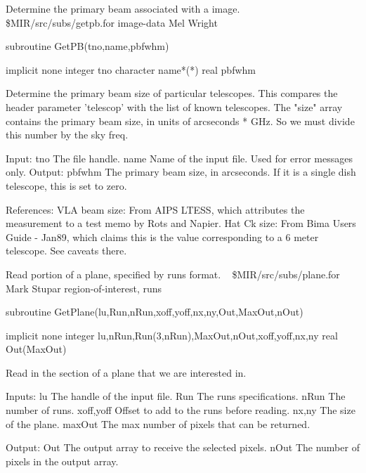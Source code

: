 %
\noindent Determine the primary beam associated with a image.
\newline \ 
\newline {} \$MIR/src/subs/getpb.for
\newline {} image-data
\newline {} Mel Wright
\par{\tenpoint
{\eightpoint\begintt
        subroutine GetPB(tno,name,pbfwhm)

        implicit none
        integer tno
        character name*(*)
        real pbfwhm

  Determine the primary beam size of particular telescopes. This compares
  the header parameter 'telescop' with the list of known telescopes.
  The "size" array contains the primary beam size, in units of
  arcseconds * GHz. So we must divide this number by the sky freq.

  Input:
    tno        The file handle.
    name       Name of the input file. Used for error messages only.
  Output:
    pbfwhm     The primary beam size, in arcseconds. If it is a single
               dish telescope, this is set to zero.

  References:
    VLA beam size: From AIPS LTESS, which attributes the measurement to
       a test memo by Rots and Napier.
    Hat Ck size: From Bima Users Guide - Jan89, which claims this is the
       value corresponding to a 6 meter telescope. See caveats there.
\endtt}
\par}
%
\noindent Read portion of a plane, specified by runs format.
\newline \ 
\newline {} \$MIR/src/subs/plane.for
\newline {} Mark Stupar
\newline \abox{Keywords:} region-of-interest, runs
\par{\tenpoint
{\eightpoint\begintt
        subroutine GetPlane(lu,Run,nRun,xoff,yoff,nx,ny,Out,MaxOut,nOut)

        implicit none
        integer lu,nRun,Run(3,nRun),MaxOut,nOut,xoff,yoff,nx,ny
        real Out(MaxOut)

  Read in the section of a plane that we are interested in.

  Inputs:
    lu         The handle of the input file.
    Run        The runs specifications.
    nRun       The number of runs.
    xoff,yoff  Offset to add to the runs before reading.
    nx,ny      The size of the plane.
    maxOut     The max number of pixels that can be returned.

  Output:
    Out        The output array to receive the selected pixels.
    nOut       The number of pixels in the output array.
\endtt}
\par}
